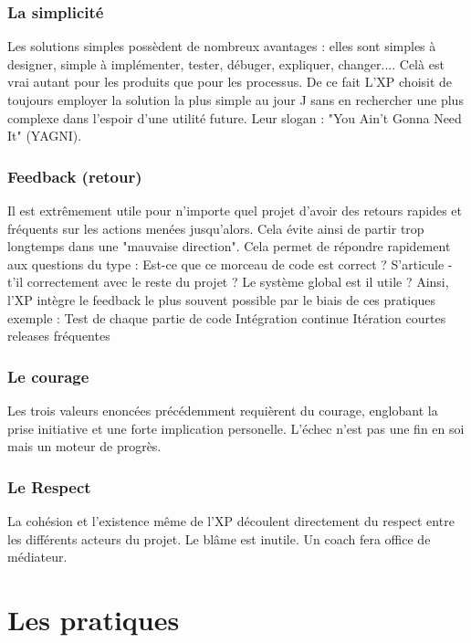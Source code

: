 \documentclass[a4paper,oneside,11pt]{report}
\begin{document}
\subsubsection{La simplicité}

Les solutions simples possèdent de nombreux avantages : elles sont simples à designer, simple à implémenter, tester, débuger, expliquer, changer....  Celà est vrai autant pour les produits que pour les processus. De ce fait L'XP choisit de toujours employer la solution la plus simple au jour J sans en rechercher une  plus complexe dans l'espoir d'une utilité future. Leur slogan : "You Ain't Gonna Need It" (YAGNI).


\subsubsection{Feedback (retour)}

Il est extrêmement utile pour n'importe quel projet d'avoir des retours rapides et fréquents sur les actions menées jusqu'alors. Cela évite ainsi de partir trop longtemps dans une "mauvaise direction". Cela permet de répondre rapidement aux questions du type   : Est-ce que ce morceau de code est correct ? S'articule -t'il correctement avec le reste du projet ? Le système global est il utile ? 
Ainsi, l'XP intègre le feedback le plus souvent possible par le biais de ces pratiques exemple :
Test de chaque partie de code
Intégration continue
Itération courtes
releases fréquentes



\subsubsection{Le courage}

Les trois valeurs enoncées précédemment requièrent du courage, englobant la prise initiative et une forte implication personelle. L'échec n'est pas une fin en soi mais un moteur de progrès.

\subsubsection{Le Respect}

La cohésion et l'existence même de l'XP  découlent directement du respect entre les différents acteurs du projet. Le blâme est inutile. Un coach fera office de médiateur.




\section{Les pratiques}
\end{document}

